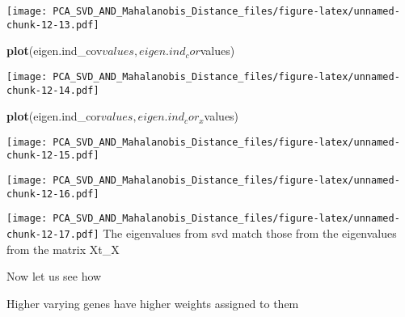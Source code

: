 \documentclass[]{article}
\newenvironment{Shaded}{\begin{snugshade}}{\end{snugshade}}
\newcommand{\KeywordTok}[1]{\textcolor[rgb]{0.13,0.29,0.53}{\textbf{{#1}}}}
\newcommand{\DataTypeTok}[1]{\textcolor[rgb]{0.13,0.29,0.53}{{#1}}}
\newcommand{\DecValTok}[1]{\textcolor[rgb]{0.00,0.00,0.81}{{#1}}}
\newcommand{\NormalTok}[1]{{#1}}
\begin{document}
\texttt{[image: PCA\_SVD\_AND\_Mahalanobis\_Distance\_files/figure-latex/unnamed-chunk-12-13.pdf]}

\begin{Shaded}
\begin{Highlighting}[]
\KeywordTok{plot}\NormalTok{(eigen.ind_cov$values,eigen.ind_cor$values)}
\end{Highlighting}
\end{Shaded}

\texttt{[image: PCA\_SVD\_AND\_Mahalanobis\_Distance\_files/figure-latex/unnamed-chunk-12-14.pdf]}

\begin{Shaded}
\begin{Highlighting}[]
\KeywordTok{plot}\NormalTok{(eigen.ind_cor$values,eigen.ind_cor_x$values)}
\end{Highlighting}
\end{Shaded}

\texttt{[image: PCA\_SVD\_AND\_Mahalanobis\_Distance\_files/figure-latex/unnamed-chunk-12-15.pdf]}

\begin{Shaded}
\end{Shaded}

\texttt{[image: PCA\_SVD\_AND\_Mahalanobis\_Distance\_files/figure-latex/unnamed-chunk-12-16.pdf]}

\begin{Shaded}
\end{Shaded}

\texttt{[image: PCA\_SVD\_AND\_Mahalanobis\_Distance\_files/figure-latex/unnamed-chunk-12-17.pdf]}
The eigenvalues from svd match those from the eigenvalues from the
matrix Xt\_X

Now let us see how

Higher varying genes have higher weights assigned to them

\begin{Shaded}
\end{Shaded}
\end{document}
